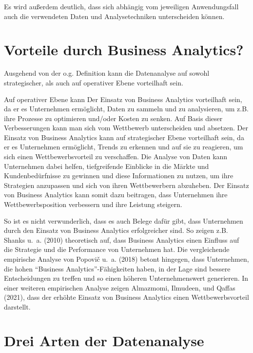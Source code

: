 \documentclass[
  letterpaper,
  DIV=11]{scrreprt}
\begin{document}
Es wird außerdem deutlich, dass sich abhängig vom jeweiligen
Anwendungsfall auch die verwendeten Daten und Analysetechniken
unterscheiden können.

\hypertarget{vorteile-durch-business-analytics}{%
\section{Vorteile durch Business
Analytics?}\label{vorteile-durch-business-analytics}}

Ausgehend von der o.g. Definition kann die Datenanalyse auf sowohl
strategischer, als auch auf operativer Ebene vorteilhaft sein.

Auf operativer Ebene kann Der Einsatz von Business Analytics vorteilhaft
sein, da er es Unternehmen ermöglicht, Daten zu sammeln und zu
analysieren, um z.B. ihre Prozesse zu optimieren und/oder Kosten zu
senken. Auf Basis dieser Verbesserungen kann man sich vom Wettbewerb
unterscheiden und absetzen. Der Einsatz von Business Analytics kann auf
strategischer Ebene vorteilhaft sein, da er es Unternehmen ermöglicht,
Trends zu erkennen und auf sie zu reagieren, um sich einen
Wettbewerbsvorteil zu verschaffen. Die Analyse von Daten kann
Unternehmen dabei helfen, tiefgreifende Einblicke in die Märkte und
Kundenbedürfnisse zu gewinnen und diese Informationen zu nutzen, um ihre
Strategien anzupassen und sich von ihren Wettbewerbern abzuheben. Der
Einsatz von Business Analytics kann somit dazu beitragen, dass
Unternehmen ihre Wettbewerbsposition verbessern und ihre Leistung
steigern.

So ist es nicht verwunderlich, dass es auch Belege dafür gibt, dass
Unternehmen durch den Einsatz von Business Analytics erfolgreicher sind.
So zeigen z.B. Shanks u.~a. (2010) theoretisch auf, dass Business
Analytics einen Einfluss auf die Strategie und die Performance von
Unternehmen hat. Die vergleichende empirische Analyse von Popovič u.~a.
(2018) betont hingegen, dass Unternehmen, die hohen ``Business
Analytics''-Fähigkeiten haben, in der Lage sind bessere Entscheidungen
zu treffen und so einen höheren Unternehmenswert generieren. In einer
weiteren empirischen Analyse zeigen Almazmomi, Ilmudeen, und Qaffas
(2021), dass der erhöhte Einsatz von Business Analytics einen
Wettbewerbsvorteil darstellt.

\hypertarget{drei-arten-der-datenanalyse}{%
\section{Drei Arten der
Datenanalyse}\label{drei-arten-der-datenanalyse}}
\end{document}
